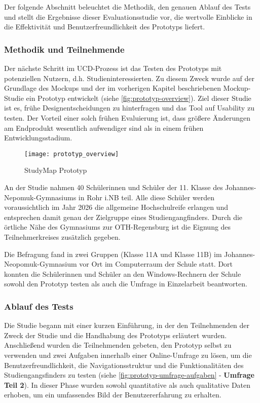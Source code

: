 Der folgende Abschnitt beleuchtet die Methodik, den genauen Ablauf des Tests und stellt die Ergebnisse dieser Evaluationsstudie vor, die wertvolle Einblicke in die Effektivität und Benutzerfreundlichkeit des Prototyps liefert.

\subsubsection{Methodik und Teilnehmende}
Der nächste Schritt im UCD-Prozess ist das Testen des Prototyps mit potenziellen Nutzern, d.h. Studieninteressierten. Zu diesem Zweck wurde auf der Grundlage des Mockups und der im vorherigen Kapitel beschriebenen Mockup-Studie ein Prototyp entwickelt (siehe \autoref{fig:prototyp-overview}). Ziel dieser Studie ist es, frühe Designentscheidungen zu hinterfragen und das Tool auf Usability zu testen. Der Vorteil einer solch frühen Evaluierung ist, dass größere Änderungen am Endprodukt wesentlich aufwendiger sind als in einem frühen Entwicklungsstadium.

\begin{figure}[H]
    \centering
    \texttt{[image: prototyp\_overview]}
    \caption{StudyMap Prototyp}
    \label{fig:prototyp-overview}
\end{figure}

An der Studie nahmen 40 Schülerinnen und Schüler der 11. Klasse des Johannes-Nepomuk-Gymnasiums in Rohr i.NB teil. Alle diese Schüler werden voraussichtlich im Jahr 2026 die allgemeine Hochschulreife erlangen und entsprechen damit genau der Zielgruppe eines Studiengangfinders. Durch die örtliche Nähe des Gymnasiums zur OTH-Regensburg ist die Eignung des Teilnehmerkreises zusätzlich gegeben.

Die Befragung fand in zwei Gruppen (Klasse 11A und Klasse 11B) im Johannes-Neopomuk-Gymnasium vor Ort im Computerraum der Schule statt. Dort konnten die Schülerinnen und Schüler an den Windows-Rechnern der Schule sowohl den Prototyp testen als auch die Umfrage in Einzelarbeit beantworten.

\subsubsection{Ablauf des Tests}
Die Studie begann mit einer kurzen Einführung, in der den Teilnehmenden der
Zweck der Studie und die Handhabung des Prototyps erläutert wurden. Anschließend
wurden die Teilnehmenden gebeten, den Prototyp selbst zu verwenden und zwei
Aufgaben innerhalb einer Online-Umfrage zu lösen, um die Benutzerfreundlichkeit, die Navigationsstruktur und
die Funktionalitäten des Studiengangsfinders zu testen (siehe
\autoref{fig:prototyp-umfrage-aufgaben} - \textbf{Umfrage Teil 2}). In dieser Phase wurden sowohl
quantitative als auch qualitative Daten erhoben, um ein umfassendes Bild der 
Benutzererfahrung zu erhalten.

